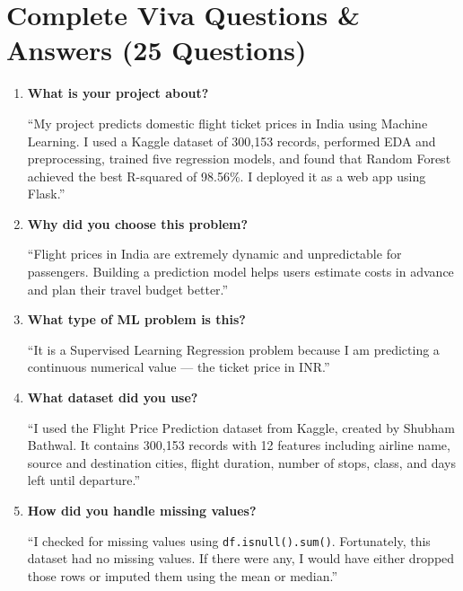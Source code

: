 \documentclass[12pt, a4paper]{article}
\begin{document}

\part{Complete Viva Questions \& Answers (25 Questions)}

\begin{enumerate}[leftmargin=*, label=\textbf{Q\arabic*.}]

\item \textbf{What is your project about?}
\begin{tipbox}[title=Answer]
    ``My project predicts domestic flight ticket prices in India using Machine Learning. I used a Kaggle dataset of 300,153 records, performed EDA and preprocessing, trained five regression models, and found that Random Forest achieved the best R-squared of 98.56\%. I deployed it as a web app using Flask.''
\end{tipbox}

\item \textbf{Why did you choose this problem?}
\begin{tipbox}[title=Answer]
    ``Flight prices in India are extremely dynamic and unpredictable for passengers. Building a prediction model helps users estimate costs in advance and plan their travel budget better.''
\end{tipbox}

\item \textbf{What type of ML problem is this?}
\begin{tipbox}[title=Answer]
    ``It is a Supervised Learning Regression problem because I am predicting a continuous numerical value — the ticket price in INR.''
\end{tipbox}

\item \textbf{What dataset did you use?}
\begin{tipbox}[title=Answer]
    ``I used the Flight Price Prediction dataset from Kaggle, created by Shubham Bathwal. It contains 300,153 records with 12 features including airline name, source and destination cities, flight duration, number of stops, class, and days left until departure.''
\end{tipbox}

\item \textbf{How did you handle missing values?}
\begin{tipbox}[title=Answer]
    ``I checked for missing values using \texttt{df.isnull().sum()}. Fortunately, this dataset had no missing values. If there were any, I would have either dropped those rows or imputed them using the mean or median.''
\end{tipbox}


\end{enumerate}
\end{document}
